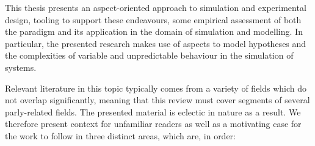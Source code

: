 %
%



This thesis presents an aspect-oriented approach to simulation and experimental
design, tooling to support these endeavours, some empirical assessment of both
the paradigm and its application in the domain of simulation and modelling. In
particular, the presented research makes use of aspects to model hypotheses and
the complexities of variable and unpredictable behaviour in the simulation of
\sociotechnical systems.

Relevant literature in this topic typically comes from a variety of fields which
do not overlap significantly, meaning that this review must cover segments of
several parly-related fields. The presented material is eclectic in nature as a
result. We therefore present context for unfamiliar readers as well as a
motivating case for the work to follow in three distinct areas, which are, in
order:

